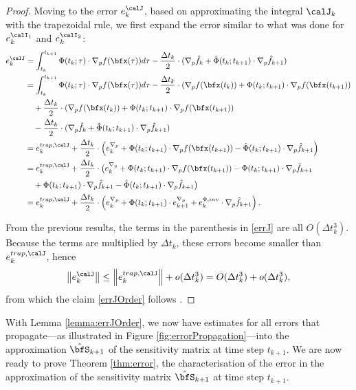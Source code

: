 \documentclass[DIV=12]{scrartcl} %
\newcommand{\err}{\ensuremath{e}}
\theoremstyle{definition}
\begin{document}
\begin{proof}
Moving to the error $\err_k^\calJ$, based on approximating the integral $\calJ_k$ with the trapezoidal rule, we first expand the error similar to what was done for $\err_k^{\calI_1}$ and $\err_k^{\calI_2}$:
\begin{align}
    \err_k^{\calJ} &= \int_{t_k}^{t_{k+1}}\Phi(t_k;\tau)\cdot \nabla_pf(\bfx(\tau))d\tau - \frac{\Delta t_k}{2}\cdot(\nabla_p\hat{f}_k+\hat{\Phi}(t_{k};t_{k+1})\cdot\nabla_p\hat{f}_{k+1}) \nonumber\\
    &= \int_{t_k}^{t_{k+1}}\Phi(t_k;\tau)\cdot \nabla_pf(\bfx(\tau))d\tau -\frac{\Delta t_k}{2}\cdot(\nabla_pf(\bfx(t_k))+\Phi(t_{k};t_{k+1})\cdot\nabla_pf(\bfx(t_{k+1})) \nonumber\\
    & \quad +\frac{\Delta t_k}{2}\cdot(\nabla_pf(\bfx(t_k))+\Phi(t_{k};t_{k+1})\cdot\nabla_pf(\bfx(t_{k+1})) \nonumber \\
    & \quad - \frac{\Delta t_k}{2}\cdot(\nabla_p\hat{f}_k+\hat{\Phi}(t_{k};t_{k+1})\cdot\nabla_p\hat{f}_{k+1}) \nonumber\\
    &=\err_k^{trap,\calJ}+\frac{\Delta t_k}{2}\cdot \left(\err_k^{\nabla_p}+\Phi(t_k;t_{k+1})\cdot\nabla_pf(\bfx(t_{k+1}))-\hat{\Phi}(t_k;t_{k+1})\cdot\nabla_p\hat{f}_{k+1}\right)\nonumber\\
    &=\err_k^{trap,\calJ}+\frac{\Delta t_k}{2}\cdot \bigl(\err_k^{\nabla_p}+\Phi(t_k;t_{k+1})\cdot\nabla_pf(\bfx(t_{k+1}))-\Phi(t_k;t_{k+1})\cdot\nabla_p\hat{f}_{k+1}\nonumber\\
    & \quad +\Phi(t_k;t_{k+1})\cdot\nabla_p\hat{f}_{k+1}-\hat{\Phi}(t_k;t_{k+1})\cdot\nabla_p\hat{f}_{k+1}\bigr)\nonumber\\
    &=
    \err_k^{trap,\calJ}+\frac{\Delta t_k}{2}\cdot \left(\err_k^{\nabla_p}+\Phi(t_k;t_{k+1})\cdot \err_{k+1}^{\nabla_p}+\err_k^{\Phi,inv}\cdot\nabla_p\hat{f}_{k+1}\right)\label{errJ}.
\end{align}


From the previous results, the terms in the parenthesis in \eqref{errJ} are all $O(\Delta t_k^3)$. Because the terms are multiplied by $\Delta t_k$, these errors become smaller than $\err_k^{trap,\calJ}$, hence
\[
\left\|\err_k^{\calJ}\right\|\le \left\|\err_k^{trap,\calJ}\right\|+o(\Delta t_k^3)=O(\Delta t_k^3) + o(\Delta t_k^3),
\]
from which the claim \eqref{errJOrder} follows .
\end{proof}

With Lemma \ref{lemma:errJOrder}, we now have estimates for all errors that propagate—as illustrated in Figure \ref{fig:errorPropagation}—into the approximation $\hat{\bfS}_{k+1}$ of the sensitivity matrix at time step $t_{k+1}$. We are now ready to prove Theorem \ref{thm:error}, the characterisation of the error in the approximation of the sensitivity matrix $\hat{\bfS}_{k+1}$ at time step $t_{k+1}$.  
\end{document}
